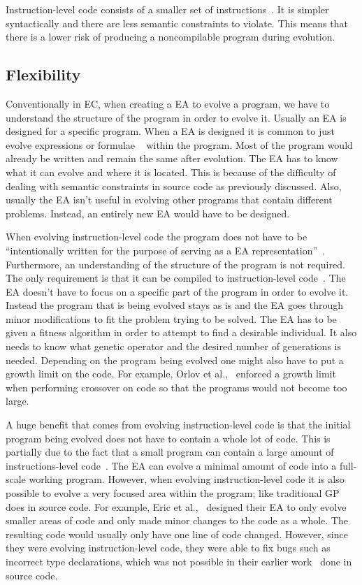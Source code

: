 \documentclass{sig-alternate}
\begin{document}
Instruction-level code consists of a smaller set of instructions~\cite{Assembly:2010}. It is simpler syntactically and there are less semantic constraints to violate. This means that there is a lower risk of producing a noncompilable program during evolution.

\subsection{Flexibility}
Conventionally in EC, when creating a EA to evolve a program, we have to understand the structure of the program in order to evolve it. Usually an EA is designed for a specific program. When a EA is designed it is common to just evolve expressions or formulae ~\cite{FINCH:2011} within the program. Most of the program would already be written and remain the same after evolution. The EA has to know what it can evolve and where it is located. This is because of the difficulty of dealing with semantic constraints in source code as previously discussed. Also, usually the EA isn't useful in evolving other programs that contain different problems. Instead, an entirely new EA would have to be designed.

When evolving instruction-level code the program does not have to be ``intentionally written for the purpose of serving as a EA representation''~\cite{FINCH2:2009}. Furthermore, an understanding of the structure of the program is not required. The only requirement is that it can be compiled to instruction-level code~\cite{FINCH2:2009, Assembly:2010}. The EA doesn't have to focus on a specific part of the program in order to evolve it. Instead the program that is being evolved stays as is and the EA goes through minor modifications to fit the problem trying to be solved. The EA has to be given a fitness algorithm in order to attempt to find a desirable individual. It also needs to know what genetic operator and the desired number of generations is needed. Depending on the program being evolved one might also have to put a growth limit on the code. For example, Orlov et al.,~\cite{FINCH:2011} enforced a growth limit when performing crossover on code so that the programs would not become too large.

A huge benefit that comes from evolving instruction-level code is that the initial program being evolved does not have to contain a whole lot of code. This is partially due to the fact that a small program can contain a large amount of instructions-level code~\cite{Assembly:2010}. The EA can evolve a minimal amount of code into a full-scale working program. However, when evolving instruction-level code it is also possible to evolve a very focused area within the program; like traditional GP does in source code. For example, Eric et al.,~\cite{Assembly:2010} designed their EA to only evolve smaller areas of code and only made minor changes to the code as a whole. The resulting code would usually only have one line of code changed. However, since they were evolving instruction-level code, they were able to fix bugs such as incorrect type declarations, which was not possible in their earlier work~\cite{Forrest:2009} done in source code. 
\end{document}
